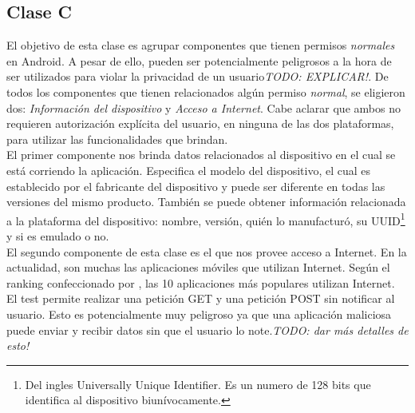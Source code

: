 \subsection{Clase C}
El objetivo de esta clase es agrupar componentes que tienen permisos \textit{normales} en Android. A pesar de ello, pueden ser potencialmente peligrosos a la hora de ser utilizados para violar la privacidad de un usuario\emph{TODO: EXPLICAR!}. De todos los componentes que tienen relacionados algún permiso \textit{normal}, se eligieron dos: \emph{Información del dispositivo} y \emph{Acceso a Internet}. Cabe aclarar que ambos no requieren autorización explícita del usuario, en ninguna de las dos plataformas, para utilizar las funcionalidades que brindan.\\
El primer componente nos brinda datos relacionados al dispositivo en el cual se está corriendo la aplicación. Especifica el modelo del dispositivo, el cual es establecido por el fabricante del dispositivo y puede ser diferente en todas las versiones del mismo producto. También se puede obtener información relacionada a la plataforma del dispositivo: nombre, versión, quién lo manufacturó, su UUID\footnote{Del ingles Universally Unique Identifier. Es un numero de 128 bits que identifica al dispositivo biunívocamente.} y si es emulado o no.\\
El segundo componente de esta clase es el que nos provee acceso a Internet. En la actualidad, son muchas las aplicaciones móviles que utilizan Internet. Según el ranking confeccionado por \cite{BOA}, las 10 aplicaciones más populares utilizan Internet. El test permite realizar una petición GET y una petición POST sin notificar al usuario. Esto es potencialmente muy peligroso ya que una aplicación maliciosa puede enviar y recibir datos sin que el usuario lo note.\emph{TODO: dar más detalles de esto!}